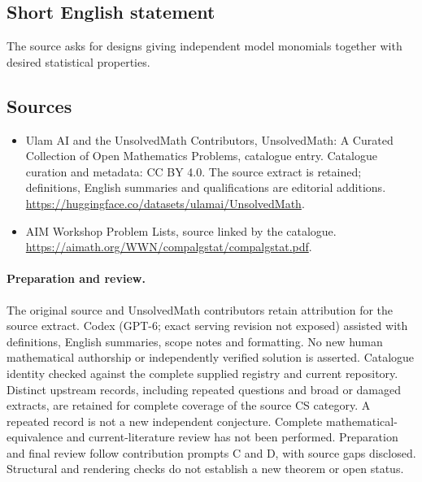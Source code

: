 \documentclass[11pt]{article}
\begin{document}
\subsection{Short English statement}
The source asks for designs giving independent model monomials together with desired statistical properties.
\subsection{Sources}
\begin{itemize}
\item[\hypertarget{source:statement:1}{S1}] Ulam AI and the UnsolvedMath Contributors, UnsolvedMath: A Curated Collection of Open Mathematics Problems, catalogue entry. Catalogue curation and metadata: CC BY 4.0. The source extract is retained; definitions, English summaries and qualifications are editorial additions.
\url{https://huggingface.co/datasets/ulamai/UnsolvedMath}.
\item[\hypertarget{source:statement:2}{S2}] AIM Workshop Problem Lists, source linked by the catalogue.
\url{https://aimath.org/WWN/compalgstat/compalgstat.pdf}.
\end{itemize}
\paragraph{Preparation and review.}
The original source and UnsolvedMath contributors retain attribution for the source extract. Codex (GPT-6; exact serving revision not exposed) assisted with definitions, English summaries, scope notes and formatting. No new human mathematical authorship or independently verified solution is asserted. Catalogue identity checked against the complete supplied registry and current repository. Distinct upstream records, including repeated questions and broad or damaged extracts, are retained for complete coverage of the source CS category. A repeated record is not a new independent conjecture. Complete mathematical-equivalence and current-literature review has not been performed. Preparation and final review follow contribution prompts C and D, with source gaps disclosed. Structural and rendering checks do not establish a new theorem or open status.
\label{end:statement}
\end{document}
